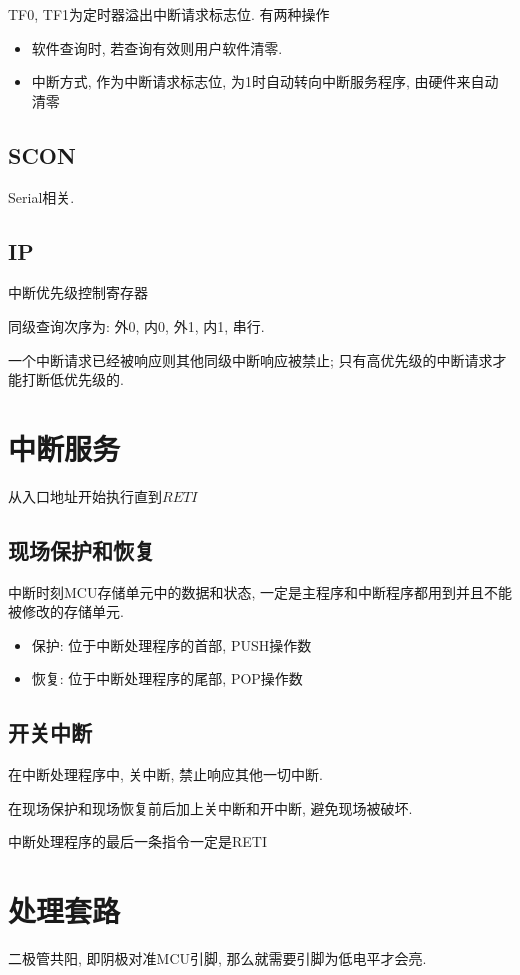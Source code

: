 \documentclass[a4paper]{report}
\begin{document}
TF0, TF1为定时器溢出中断请求标志位. 有两种操作
\begin{itemize}
  \item 软件查询时, 若查询有效则用户软件清零. 
  \item 中断方式, 作为中断请求标志位, 为1时自动转向中断服务程序, 由硬件来自动清零
\end{itemize}

\subsection{SCON}
Serial相关. 

\subsection{IP}
中断优先级控制寄存器

同级查询次序为: 外0, 内0, 外1, 内1, 串行. 

一个中断请求已经被响应则其他同级中断响应被禁止; 只有高优先级的中断请求才能打断低优先级的. 

\section{中断服务}
从入口地址开始执行直到$RETI$
\subsection{现场保护和恢复}
中断时刻MCU存储单元中的数据和状态, 一定是主程序和中断程序都用到并且不能被修改的存储单元. 
\begin{itemize}
  \item 保护: 位于中断处理程序的首部, PUSH操作数
  \item 恢复: 位于中断处理程序的尾部, POP操作数
\end{itemize}
\subsection{开关中断}
在中断处理程序中, 关中断, 禁止响应其他一切中断. 

在现场保护和现场恢复前后加上关中断和开中断, 避免现场被破坏. 

中断处理程序的最后一条指令一定是RETI
\section{处理套路}
二极管共阳, 即阴极对准MCU引脚, 那么就需要引脚为低电平才会亮. 
\end{document}
